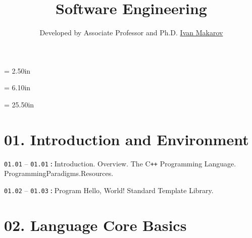 \documentclass[a4paper,12pt]{article}
\renewenvironment{itemize}
{
    \begin{list}{\labelitemi}
    {
      \setlength{\topsep}{0pt}
      \setlength{\partopsep}{0pt}
      \setlength{\parskip}{0pt}
      \setlength{\itemsep}{0pt}
      \setlength{\parsep}{0pt}
      \setlength{\leftmargin}{14.5pt}
    }
}{\end{list}}
\begin{document}
\newpage\thispagestyle{empty}\pdfpageheight = 2.50in\enlargethispage{100in}

\title{\bf Software Engineering} 

\author{Developed by Associate Professor and Ph.D. \href{https://t.me/i_s_m_mipt}{Ivan Makarov}}

\date{}

\maketitle



\newpage\thispagestyle{empty}\pdfpageheight = 6.10in\enlargethispage{100in}

\renewcommand\contentsname{\Large Table of Contents}

\renewcommand{\cftdotsep}{0.5}

\renewcommand{\cftsecleader}{\cftdotfill{\cftdotsep}}

\makeatletter
\let\latexl@section\l@section
\def\l@section#1#2{\begingroup\let\numberline\@gobble\latexl@section{#1}{#2}\endgroup}
\makeatother

\titlelabel{}




\newpage\thispagestyle{empty}\pdfpageheight = 25.50in\enlargethispage{100in}



\section{01. Introduction and Environment}

\begin{itemize}

    \item \texttt{01.01} -- \texttt{01.01}\,\texttt{:}\,Introduction. Overview. The C\texttt{++} Programming Language. Programming\:Paradigms.\:Resources.

    \smallskip

    \item \texttt{01.02} -- \texttt{01.03}\,\texttt{:}\,Program Hello, World! Standard Template Library.
    
\end{itemize}

\section{02. Language Core Basics}
\end{document}
